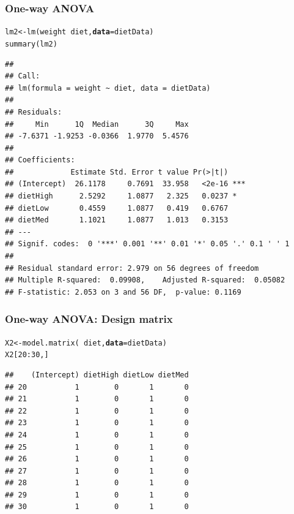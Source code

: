 \documentclass[color=usenames,dvipsnames]{beamer}\usepackage[]{graphicx}\usepackage[]{color}
\makeatletter
\newcommand{\hlnum}[1]{\textcolor[rgb]{0.69,0.494,0}{#1}}%
\newcommand{\hlopt}[1]{\textcolor[rgb]{0,0,0}{#1}}%
\newcommand{\hlstd}[1]{\textcolor[rgb]{0,0,0}{#1}}%
\newcommand{\hlkwb}[1]{\textcolor[rgb]{0,0.341,0.682}{#1}}%
\newcommand{\hlkwc}[1]{\textcolor[rgb]{0,0,0}{\textbf{#1}}}%
\newcommand{\hlkwd}[1]{\textcolor[rgb]{0.004,0.004,0.506}{#1}}%
\newenvironment{kframe}{%
 \def\at@end@of@kframe{}%
 \ifinner\ifhmode%
  \def\at@end@of@kframe{\end{minipage}}%
  \begin{minipage}{\columnwidth}%
 \fi\fi%
 \def\FrameCommand##1{\hskip\@totalleftmargin \hskip-\fboxsep
 \colorbox{shadecolor}{##1}\hskip-\fboxsep
     \hskip-\linewidth \hskip-\@totalleftmargin \hskip\columnwidth}%
 \MakeFramed {\advance\hsize-\width
   \@totalleftmargin\z@ \linewidth\hsize
   \@setminipage}}%
 {\par\unskip\endMakeFramed%
 \at@end@of@kframe}
\newenvironment{knitrout}{}{} %
\makeatother
\begin{document}
\begin{frame}[fragile]
  \frametitle{One-way ANOVA}
  \scriptsize %
\begin{knitrout}\scriptsize
{}\color{fgcolor}\begin{kframe}
\begin{alltt}
\hlstd{lm2} \hlkwb{<-} \hlkwd{lm}\hlstd{(weight} \hlopt{~} \hlstd{diet,} \hlkwc{data}\hlstd{=dietData)}
\hlkwd{summary}\hlstd{(lm2)}
\end{alltt}
\begin{verbatim}
## 
## Call:
## lm(formula = weight ~ diet, data = dietData)
## 
## Residuals:
##     Min      1Q  Median      3Q     Max 
## -7.6371 -1.9253 -0.0366  1.9770  5.4576 
## 
## Coefficients:
##             Estimate Std. Error t value Pr(>|t|)    
## (Intercept)  26.1178     0.7691  33.958   <2e-16 ***
## dietHigh      2.5292     1.0877   2.325   0.0237 *  
## dietLow       0.4559     1.0877   0.419   0.6767    
## dietMed       1.1021     1.0877   1.013   0.3153    
## ---
## Signif. codes:  0 '***' 0.001 '**' 0.01 '*' 0.05 '.' 0.1 ' ' 1
## 
## Residual standard error: 2.979 on 56 degrees of freedom
## Multiple R-squared:  0.09908,	Adjusted R-squared:  0.05082 
## F-statistic: 2.053 on 3 and 56 DF,  p-value: 0.1169
\end{verbatim}
\end{kframe}
\end{knitrout}
\end{frame}



\begin{frame}[fragile]
  \frametitle{One-way ANOVA: Design matrix}
\begin{knitrout}
\color{fgcolor}\begin{kframe}
\begin{alltt}
\hlstd{X2} \hlkwb{<-} \hlkwd{model.matrix}\hlstd{(}\hlopt{~}\hlstd{diet,} \hlkwc{data}\hlstd{=dietData)}
\hlstd{X2[}\hlnum{20}\hlopt{:}\hlnum{30}\hlstd{,]}
\end{alltt}
\begin{verbatim}
##    (Intercept) dietHigh dietLow dietMed
## 20           1        0       1       0
## 21           1        0       1       0
## 22           1        0       1       0
## 23           1        0       1       0
## 24           1        0       1       0
## 25           1        0       1       0
## 26           1        0       1       0
## 27           1        0       1       0
## 28           1        0       1       0
## 29           1        0       1       0
## 30           1        0       1       0
\end{verbatim}
\end{kframe}
\end{knitrout}
\end{frame}
\end{document}
